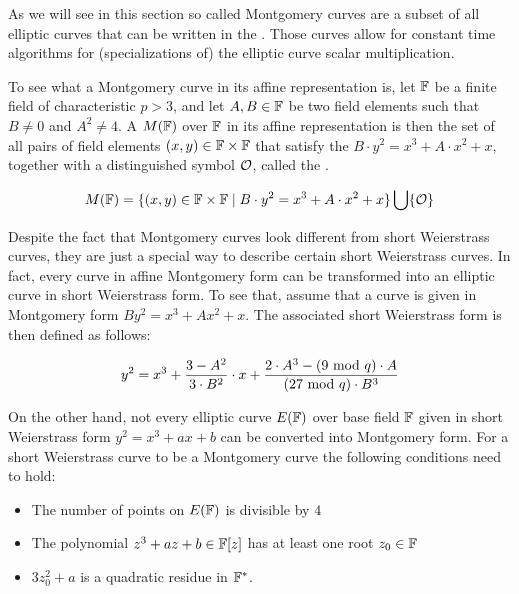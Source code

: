 As we will see in this section so called Montgomery curves are a subset of all elliptic curves that can be written in the . Those curves allow for constant time algorithms for (specializations of) the elliptic curve scalar multiplication. 

To see what a Montgomery curve in its affine representation is, let $\mathbb{F}$ be a finite field of characteristic $p>3$, and let $A,B\in \mathbb{F}$ be two field elements such that $B\neq 0$ and $A^2 \neq 4$.  A  $M(\mathbb{F})$ over $\mathbb{F}$ in its affine representation is then the set of all pairs of field elements $(x,y)\in \mathbb{F}\times \mathbb{F}$ that satisfy the  $B\cdot y^2 = x^3 + A\cdot x^2 + x$, together with a distinguished symbol $\mathcal{O}$, called the .

\begin{equation}
\label{eq:montgomery-curve}
M(\mathbb{F}) = \{(x,y)\in \mathbb{F}\times \mathbb{F}\;|\; B\cdot y^2 = x^3 + A\cdot x^2 + x  \} \bigcup \{\mathcal{O}\}
\end{equation}

Despite the fact that Montgomery curves look different from short Weierstrass curves, they are just a special way to describe certain short Weierstrass curves. In fact, every curve in affine Montgomery form can be transformed into an elliptic curve in short Weierstrass form. To see that, assume that a curve is given in Montgomery form $B y^2 = x^3 + A x^2 + x$. The associated short Weierstrass form is then defined as follows:

\begin{equation}\label{eq:montgomery-to-weierstrass}
y^2 = x^3 + \frac{3-A^2}{3\cdot B^2}\cdot x + \frac{2\cdot A^3-(9 \text{ mod } q)\cdot A}{(27 \text{ mod } q)\cdot B^3}
\end{equation}

On the other hand, not every elliptic curve $E(\mathbb{F})$ over base field $\mathbb{F}$ given in short Weierstrass form $y^2 = x^3 + a x + b$ can be converted into Montgomery form. For a short Weierstrass curve to be a Montgomery curve the following conditions need to hold:
\begin{itemize}
\label{def:montgomery}
\item The number of points on $E(\mathbb{F})$ is divisible by $4$
\item The polynomial $z^3 + a z + b \in \mathbb{F}[z]$ has at least one root $z_0\in\mathbb{F}$
\item $3z_0^2 + a$ is a quadratic residue in $\mathbb{F}^*$.
\end{itemize}

